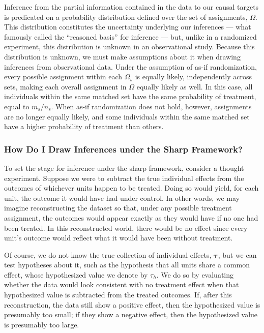 \documentclass[twoside,11pt]{article}
\begin{document}
Inference from the partial information contained in the data to our
causal targets is predicated on a probability distribution defined over
the set of assignments, \(\Omega\). This distribution constitutes the
uncertainty underlying our inferences --- what \citet[p.~14]{fisher1935}
famously called the ``reasoned basis'' for inference --- but, unlike in
a randomized experiment, this distribution is unknown in an
observational study. Because this distribution is unknown, we must make
assumptions about it when drawing inferences from observational data.
Under the assumption of as-if randomization, every possible assignment
within each \(\Omega_s\) is equally likely, independently across sets, making each overall
assignment in \(\Omega\) equally likely as well. In this case, all
individuals within the same matched set have the same probability of
treatment, equal to \(m_s / n_s\). When as-if randomization does not
hold, however, assignments are no longer equally likely, and some
individuals within the same matched set have a higher probability of treatment than others.

\subsubsection{How Do I Draw Inferences under the Sharp
Framework?}\label{how-do-i-draw-inferences-under-the-sharp-framework}

To set the stage for inference under the sharp framework, consider a
thought experiment. Suppose we were to subtract the true individual
effects from the outcomes of whichever units happen to be treated. Doing
so would yield, for each unit, the outcome it would have had under
control. In other words, we may imagine reconstructing the dataset so
that, under any possible treatment assignment, the outcomes would appear
exactly as they would have if no one had been treated. In this
reconstructed world, there would be no effect since every unit's outcome
would reflect what it would have been without treatment.

Of course, we do not know the true collection of individual effects,
\(\bm{\tau}\), but we can test hypotheses about it, such as the
hypothesis that all units share a common effect, whose hypothesized value we denote by \(\tau_h\).
We do so by evaluating whether the data would look consistent with no
treatment effect when that hypothesized value is subtracted from the
treated outcomes. If, after this reconstruction, the data still show a
positive effect, then the hypothesized value is presumably too small; if
they show a negative effect, then the hypothesized value is presumably
too large.
\end{document}
